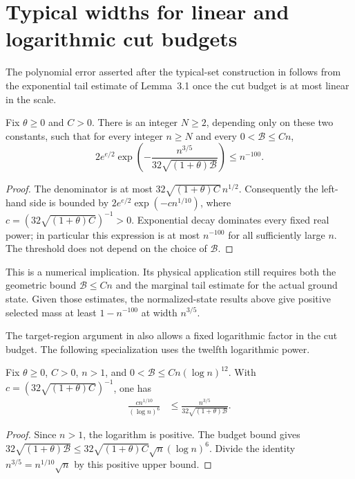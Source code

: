 \section{Typical widths for linear and logarithmic cut budgets}
\label{sec:typical_tail_scales}

The polynomial error asserted after the typical-set construction in
\cite[Section~7]{OpenAI2026AreaLaw} follows from the exponential tail estimate
of Lemma~3.1 once the cut budget is at most linear in the scale.

\begin{theorem}
\label{thm:typical_tail_linear_budget}
\leanok
Fix $\theta\ge0$ and $C>0$. There is an integer $N\ge2$, depending only on
these two constants, such that for every integer $n\ge N$ and every
$0<\mathcal B\le Cn$,
\[
2e^{e/2}\exp\!\left(-\frac{n^{3/5}}
 {32\sqrt{(1+\theta)\mathcal B}}\right)\le n^{-100}.
\]
\end{theorem}
\begin{proof}
\leanok
The denominator is at most
$32\sqrt{(1+\theta)C}\,n^{1/2}$. Consequently the left-hand side is bounded
by $2e^{e/2}\exp(-cn^{1/10})$, where
$c=(32\sqrt{(1+\theta)C})^{-1}>0$.
Exponential decay dominates every fixed real power; in particular this
expression is at most $n^{-100}$ for all sufficiently large $n$.
The threshold does not depend on the choice of $\mathcal B$.
\end{proof}

This is a numerical implication. Its physical application still requires
both the geometric bound $\mathcal B\le Cn$ and the marginal tail estimate
for the actual ground state. Given those estimates, the normalized-state
results above give positive selected mass at least $1-n^{-100}$ at width
$n^{3/5}$.

The target-region argument in \cite[Section~8]{OpenAI2026AreaLaw}
also allows a fixed logarithmic factor in the cut budget. The following
specialization uses the twelfth logarithmic power.

\begin{theorem}
\label{thm:typical_tail_log_budget_exponent}
\leanok
Fix $\theta\ge0$, $C>0$, $n>1$, and
$0<\mathcal B\le Cn(\log n)^{12}$. With
$c=(32\sqrt{(1+\theta)C})^{-1}$, one has
\begin{align}
\frac{c n^{1/10}}{(\log n)^6}
&\le \frac{n^{3/5}}{32\sqrt{(1+\theta)\mathcal B}}.
\end{align}
\end{theorem}
\begin{proof}
\leanok
Since $n>1$, the logarithm is positive. The budget bound gives
$32\sqrt{(1+\theta)\mathcal B}
\le32\sqrt{(1+\theta)C}\sqrt n(\log n)^6$.
Divide the identity $n^{3/5}=n^{1/10}\sqrt n$ by this positive upper bound.
\end{proof}

